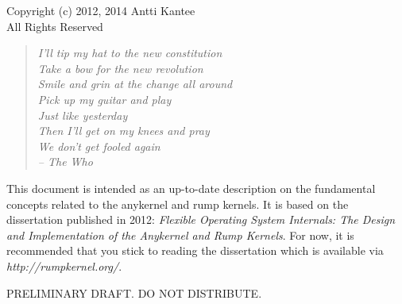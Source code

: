 \documentclass[openright]{tkkdiss}
\begin{document}


\cleardoublepage

Copyright (c) 2012, 2014 Antti Kantee\\
All Rights Reserved

\begin{preface}

\begin{verse}
\textit{I'll tip my hat to the new constitution\\
Take a bow for the new revolution\\
Smile and grin at the change all around\\
Pick up my guitar and play\\
Just like yesterday\\
Then I'll get on my knees and pray\\
We don't get fooled again\\
-- The Who}
\end{verse}

This document is intended as an up-to-date description on the fundamental
concepts related to the anykernel and rump kernels.  It is based on
the dissertation published in 2012: \textit{Flexible Operating System
Internals: The Design and Implementation of the Anykernel and Rump
Kernels}.  For now, it is recommended that you stick to reading the
dissertation which is available via \textit{http://rumpkernel.org/}.

{\large PRELIMINARY DRAFT.  DO NOT DISTRIBUTE.}

\end{preface}


\tableofcontents


\begin{listofabbreviations}

\printnomenclature[5cm]

\end{listofabbreviations}


\listoffigures
\listoftables







\end{document}
